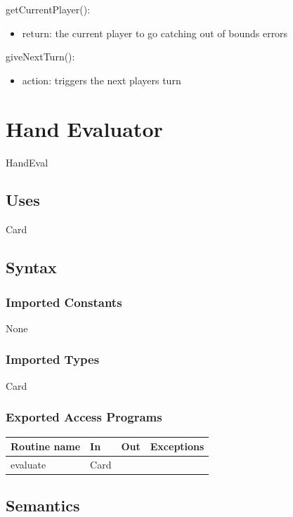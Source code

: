 \documentclass[12pt, titlepage]{article}
\begin{document}
\noindent getCurrentPlayer():
\begin{itemize}
    \item return: the current player to go
    \exception catching out of bounds errors
\end{itemize}

\noindent giveNextTurn():
\begin{itemize}
    \item action: triggers the next players turn
\end{itemize}



\section*{Hand Evaluator}

HandEval

\subsection* {Uses}

Card

\subsection* {Syntax}

\subsubsection* {Imported Constants}

None

\subsubsection* {Imported Types}

Card

\subsubsection* {Exported Access Programs}

\begin{tabular}{| l | l | l | p{5cm} |}
\hline
\textbf{Routine name} & \textbf{In} & \textbf{Out} & \textbf{Exceptions}\\
\hline
evaluate & Card & &\\
\hline
\end{tabular}

\subsection* {Semantics}
\end{document}
